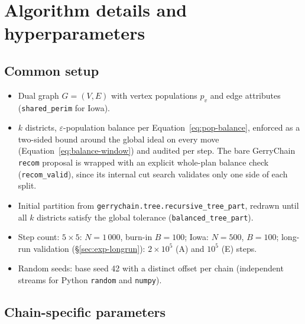 \documentclass[11pt]{article}
\begin{document}
\appendix
\section{Algorithm details and hyperparameters}\label{app:hyperparams}

\subsection{Common setup}\label{app:common}

\begin{itemize}
  \item Dual graph $G = (V, E)$ with vertex populations $p_v$ and
    edge attributes (\texttt{shared\_perim} for Iowa).
  \item $k$ districts, $\varepsilon$-population balance per
    Equation~\eqref{eq:pop-balance}, enforced as a two-sided bound around the
    global ideal on every move (Equation~\eqref{eq:balance-window})
    and audited per step. The bare GerryChain \texttt{recom} proposal
    is wrapped with an explicit whole-plan balance check
    (\texttt{recom\_valid}), since its internal cut search validates
    only one side of each split.
  \item Initial partition from
    \texttt{gerrychain.tree.recursive\_tree\_part}, redrawn until all
    $k$ districts satisfy the global tolerance
    (\texttt{balanced\_tree\_part}).
  \item Step count: $5 \times 5$: $N = 1\,000$, burn-in $B = 100$;
    Iowa: $N = 500$, $B = 100$; long-run validation
    (\S\ref{sec:exp-longrun}): $2 \times 10^5$ (A) and
    $10^5$ (E) steps.
  \item Random seeds: base seed 42 with a distinct offset per chain
    (independent streams for Python \texttt{random} and
    \texttt{numpy}).
\end{itemize}

\subsection{Chain-specific parameters}\label{app:chains}
\end{document}
